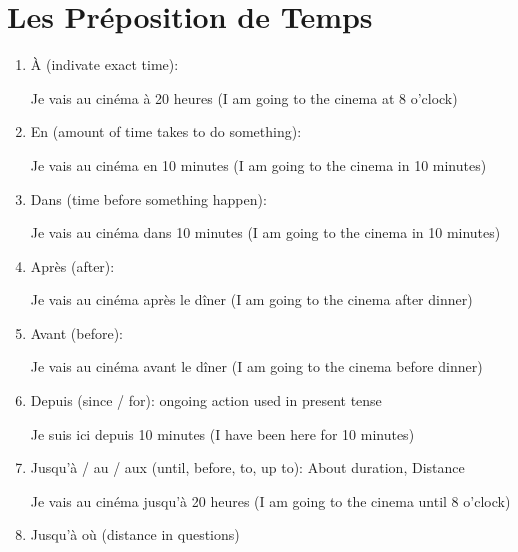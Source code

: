 \documentclass{book}
\begin{document}
    \section{Les Préposition de Temps}
        \begin{enumerate}
            \item À (indivate exact time):
                \begin{center}
                    Je vais au cinéma à 20 heures (I am going to the cinema at 8 o'clock)
                \end{center}
            \item En (amount of time takes to do something):
                \begin{center}
                    Je vais au cinéma en 10 minutes (I am going to the cinema in 10 minutes)
                \end{center}
            \item Dans (time before something happen):
                \begin{center}
                    Je vais au cinéma dans 10 minutes (I am going to the cinema in 10 minutes)
                \end{center}
            \item Après (after):
                \begin{center}
                    Je vais au cinéma après le dîner (I am going to the cinema after dinner)
                \end{center}
            \item Avant (before):
                \begin{center}
                    Je vais au cinéma avant le dîner (I am going to the cinema before dinner)
                \end{center}
            \item Depuis (since / for): ongoing action used in present tense
                \begin{center}
                    Je suis ici depuis 10 minutes (I have been here for 10 minutes)
                \end{center}
            \item Jusqu'à / au / aux (until, before, to, up to): About duration, Distance
                \begin{center}
                    Je vais au cinéma jusqu'à 20 heures (I am going to the cinema until 8 o'clock)
                \end{center}
            \item Jusqu'à où (distance in questions)

\end{enumerate}
\end{document}
